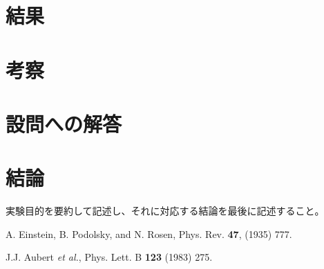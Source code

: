 \documentclass[uplatex,dvipdfmx,a4j,12pt]{jsarticle}
\begin{document}
\section{結果}

\section{考察}

\section{設問への解答}


\section{結論}

実験目的を要約して記述し、それに対応する結論を最後に記述すること。

\begin{thebibliography}{9}

        A. Einstein, B. Podolsky, and N. Rosen, 
        Phys. Rev. \textbf{47}, (1935) 777.

        J.J. Aubert \textit{et al.},
        Phys. Lett. B \textbf{123} (1983) 275.
    
\end{thebibliography}
\end{document}
